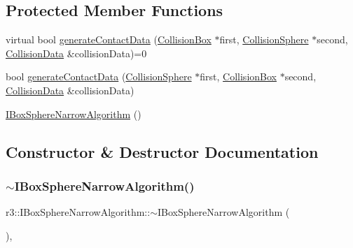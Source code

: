 \subsection*{Protected Member Functions}
\begin{DoxyCompactItemize}
\item 
virtual bool \mbox{\hyperlink{classr3_1_1_i_box_sphere_narrow_algorithm_a278a98ee22714dd2a73d4befc403be87}{generate\+Contact\+Data}} (\mbox{\hyperlink{classr3_1_1_collision_box}{Collision\+Box}} $\ast$first, \mbox{\hyperlink{classr3_1_1_collision_sphere}{Collision\+Sphere}} $\ast$second, \mbox{\hyperlink{classr3_1_1_collision_data}{Collision\+Data}} \&collision\+Data)=0
\item 
bool \mbox{\hyperlink{classr3_1_1_i_box_sphere_narrow_algorithm_a797ecee1b6db1dfc57a194b914136b7b}{generate\+Contact\+Data}} (\mbox{\hyperlink{classr3_1_1_collision_sphere}{Collision\+Sphere}} $\ast$first, \mbox{\hyperlink{classr3_1_1_collision_box}{Collision\+Box}} $\ast$second, \mbox{\hyperlink{classr3_1_1_collision_data}{Collision\+Data}} \&collision\+Data)
\item 
\mbox{\hyperlink{classr3_1_1_i_box_sphere_narrow_algorithm_ab8b57aa1583fb467fb06998487b2a5a6}{I\+Box\+Sphere\+Narrow\+Algorithm}} ()
\end{DoxyCompactItemize}


\subsection{Constructor \& Destructor Documentation}
\mbox{\label{classr3_1_1_i_box_sphere_narrow_algorithm_ac70f8e99bb2deb52c1e4686ef6fafe2d}} 
\subsubsection{\texorpdfstring{$\sim$\+I\+Box\+Sphere\+Narrow\+Algorithm()}{~IBoxSphereNarrowAlgorithm()}}
{\footnotesize\ttfamily r3\+::\+I\+Box\+Sphere\+Narrow\+Algorithm\+::$\sim$\+I\+Box\+Sphere\+Narrow\+Algorithm (\begin{DoxyParamCaption}{ }\end{DoxyParamCaption})\hspace{0.3cm}{\ttfamily [virtual]}, {\ttfamily [default]}}

